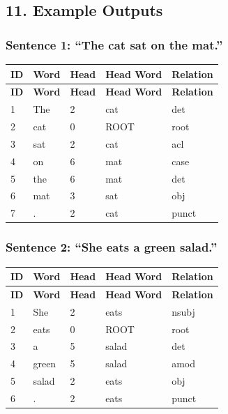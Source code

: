 \documentclass[11pt,a4paper]{article}
\begin{document}
\subsection*{11. Example Outputs}

\subsubsection*{Sentence 1: ``The cat sat on the mat.''}

{\small
\setlength{\tabcolsep}{4pt}
\begin{longtable}{lllll}
\toprule
\textbf{ID} & \textbf{Word} & \textbf{Head} & \textbf{Head Word} & \textbf{Relation} \\
\midrule
\endfirsthead
\toprule
\textbf{ID} & \textbf{Word} & \textbf{Head} & \textbf{Head Word} & \textbf{Relation} \\
\midrule
\endhead
1 & The & 2 & cat & det \\
2 & cat & 0 & ROOT & root \\
3 & sat & 2 & cat & acl \\
4 & on & 6 & mat & case \\
5 & the & 6 & mat & det \\
6 & mat & 3 & sat & obj \\
7 & . & 2 & cat & punct \\
\bottomrule
\end{longtable}}

\subsubsection*{Sentence 2: ``She eats a green salad.''}

{\small
\setlength{\tabcolsep}{4pt}
\begin{longtable}{lllll}
\toprule
\textbf{ID} & \textbf{Word} & \textbf{Head} & \textbf{Head Word} & \textbf{Relation} \\
\midrule
\endfirsthead
\toprule
\textbf{ID} & \textbf{Word} & \textbf{Head} & \textbf{Head Word} & \textbf{Relation} \\
\midrule
\endhead
1 & She & 2 & eats & nsubj \\
2 & eats & 0 & ROOT & root \\
3 & a & 5 & salad & det \\
4 & green & 5 & salad & amod \\
5 & salad & 2 & eats & obj \\
6 & . & 2 & eats & punct \\
\bottomrule
\end{longtable}}
\end{document}
